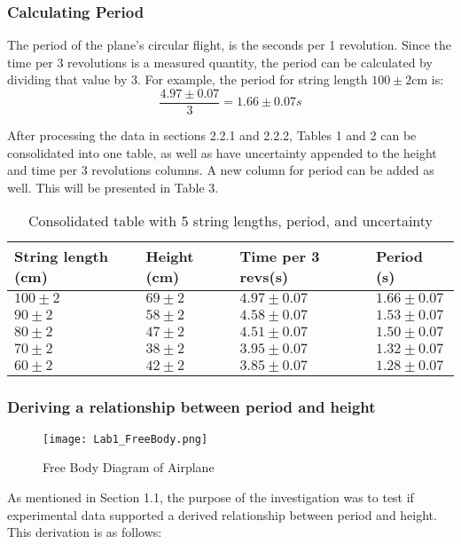 \documentclass[10pt, letterpaper]{article}
\begin{document}
\subsubsection{Calculating Period}
The period of the plane's circular flight, is the seconds per 1 revolution. Since the time per 3 revolutions is a measured quantity,
the period can be calculated by dividing that value by 3. For example, the period for string length $100 \pm 2$cm is:
\[ \frac{4.97 \pm 0.07}{3} = 1.66 \pm 0.07s \]

After processing the data in sections 2.2.1 and 2.2.2, Tables 1 and 2 can be consolidated into one table, as well as have
uncertainty appended to the height and time per 3 revolutions columns. A new column for period can be added as well. This will be presented in Table 3.

\begin{table}[H]
\begin{tabularx}{\linewidth}{>{\centering\arraybackslash}X>{\centering\arraybackslash}X>{\centering\arraybackslash}X>{\centering\arraybackslash}X }
\hline \textbf{String length (cm)} & \textbf{Height (cm)} & \textbf{Time per 3 revs(s)} & \textbf{Period (s)} \\ \hline
$100 \pm 2$ & $69 \pm 2$ & $4.97 \pm 0.07$ & $1.66 \pm 0.07$ \\ \hline
$90 \pm 2$ & $58 \pm 2$ & $4.58 \pm 0.07$ & $1.53 \pm 0.07$ \\ \hline
$80 \pm 2$ & $47 \pm 2$ & $4.51 \pm 0.07$ & $1.50 \pm 0.07$ \\ \hline
$70 \pm 2$ & $38 \pm 2$ & $3.95 \pm 0.07$ & $1.32 \pm 0.07$ \\ \hline
$60 \pm 2$ & $42 \pm 2$ & $3.85 \pm 0.07$ & $1.28 \pm 0.07$ \\ \hline
\end{tabularx}
\caption{Consolidated table with 5 string lengths, period, and uncertainty}
\end{table}

\subsubsection{Deriving a relationship between period and height}

\begin{figure}[!htb]
\centering
\texttt{[image: Lab1\_FreeBody.png]}
\caption{Free Body Diagram of Airplane}
\end{figure}


As mentioned in Section 1.1, the purpose of the investigation was to test if experimental data supported a derived relationship between
period and height. This derivation is as follows:
\end{document}

